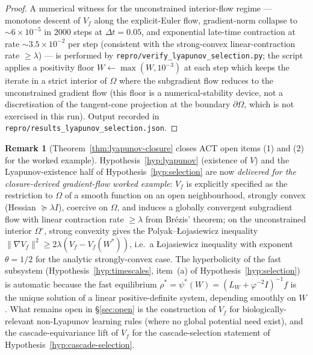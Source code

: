 \documentclass[11pt]{article}
\theoremstyle{definition}
\newtheorem{remark}[theorem]{Remark}
\begin{document}
\begin{proof}[Proof]
A numerical witness for the unconstrained interior-flow regime --- monotone descent of $V_f$ along the explicit-Euler flow, gradient-norm collapse to $\sim 6 \times 10^{-5}$ in $2000$ steps at $\Delta t = 0.05$, and exponential late-time contraction at rate $\sim 3.5 \times 10^{-2}$ per step (consistent with the strong-convex linear-contraction rate $\geq \lambda$) --- is performed by \texttt{repro/verify\_lyapunov\_selection.py}; the script applies a positivity floor $W \gets \max(W, 10^{-3})$ at each step which keeps the iterate in a strict interior of $\Omega$ where the subgradient flow reduces to the unconstrained gradient flow (this floor is a numerical-stability device, not a discretisation of the tangent-cone projection at the boundary $\partial\Omega$, which is not exercised in this run). Output recorded in \texttt{repro/results\_lyapunov\_selection.json}.
\end{proof}

\begin{remark}[Theorem~\ref{thm:lyapunov-closure} closes ACT open items (1) and (2) for the worked example]\label{rem:lyapunov-status}
Hypothesis~\ref{hyp:lyapunov} (existence of $V$) and the Lyapunov-existence half of Hypothesis~\ref{hyp:selection} are now \emph{delivered for the closure-derived gradient-flow worked example}: $V_f$ is explicitly specified as the restriction to $\Omega$ of a smooth function on an open neighbourhood, strongly convex (Hessian $\succeq \lambda I$), coercive on $\Omega$, and induces a globally convergent subgradient flow with linear contraction rate $\geq \lambda$ from Br\'{e}zis' theorem; on the unconstrained interior $\Omega^\circ$, strong convexity gives the Polyak--{\L}ojasiewicz inequality $\|\nabla V_f\|^2 \geq 2\lambda(V_f - V_f(W^*))$, i.e.\ a {\L}ojasiewicz inequality with exponent $\theta = 1/2$ for the analytic strongly-convex case. The hyperbolicity of the fast subsystem (Hypothesis~\ref{hyp:timescales}, item~(a) of Hypothesis~\ref{hyp:selection}) is automatic because the fast equilibrium $\rho^* = \psi^*(W) = (L_W + \varphi^{-2} I)^{-1} f$ is the unique solution of a linear positive-definite system, depending smoothly on $W$. What remains open in \S\ref{sec:open} is the construction of $V_f$ for biologically-relevant non-Lyapunov learning rules (where no global potential need exist), and the cascade-equivariance lift of $V_f$ for the cascade-selection statement of Hypothesis~\ref{hyp:cascade-selection}.
\end{remark}

\end{document}
